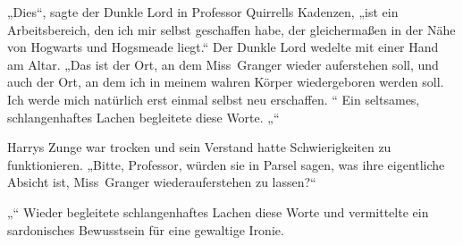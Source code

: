 „Dies“, sagte der Dunkle Lord in Professor Quirrells Kadenzen, „ist ein Arbeitsbereich, den ich mir selbst geschaffen habe, der gleichermaßen in der Nähe von Hogwarts und Hogsmeade liegt.“
Der Dunkle Lord wedelte mit einer Hand am Altar.
„Das ist der Ort, an dem Miss~Granger wieder auferstehen soll, und auch der Ort, an dem ich in meinem wahren Körper wiedergeboren werden soll. Ich werde mich natürlich erst einmal selbst neu erschaffen. “
Ein seltsames, schlangenhaftes Lachen begleitete diese Worte.
„“

Harrys Zunge war trocken und sein Verstand hatte Schwierigkeiten zu funktionieren.
„Bitte, Professor, würden sie in Parsel sagen, was ihre eigentliche Absicht ist, Miss~Granger wiederauferstehen zu lassen?“

„“ Wieder begleitete schlangenhaftes Lachen diese Worte und vermittelte ein sardonisches Bewusstsein für eine gewaltige Ironie.

